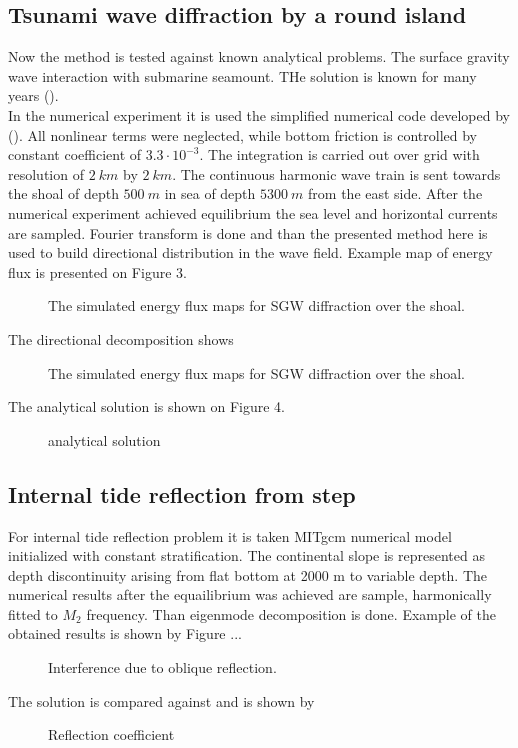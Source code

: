 \subsection{Tsunami wave diffraction by a round island}
Now the method is tested against known analytical problems. The surface gravity wave interaction with submarine seamount. THe solution is known for many years (\cite{longuet1967trapping}).\\
In the numerical experiment it is used the simplified numerical code developed by (\cite{kowalik2005numerical}). All nonlinear terms were neglected, while bottom friction is controlled by constant coefficient of $3.3 \cdot 10^{-3}$. The integration is carried out over grid with resolution of $2~km$ by $2~km$. The continuous harmonic wave train is sent towards the shoal of depth $500~m$ in sea of depth $5300~m$ from the east side. After the numerical experiment achieved equilibrium the sea level and horizontal currents are sampled. Fourier transform is done and than the presented method here is used to build directional distribution in the wave field. Example map of energy flux is presented on Figure 3.\\
\begin{figure}
\caption{The simulated energy flux maps for SGW diffraction over the shoal.}
\end{figure}
The directional decomposition shows 
\begin{figure}
\caption{The simulated energy flux maps for SGW diffraction over the shoal.}
\end{figure}
The analytical solution is shown on Figure 4.
\begin{figure}
\caption{analytical solution}
\end{figure}

\subsection{Internal tide reflection from step}
For internal tide reflection problem it is taken MITgcm numerical model initialized with constant stratification. The continental slope is represented as depth discontinuity arising from flat bottom at 2000 m to variable depth. The numerical results after the equailibrium was achieved are sample, harmonically fitted to $M_2$ frequency. Than eigenmode decomposition is done. Example of the obtained results is shown by Figure ...\\
\begin{figure}
\caption{Interference due to oblique reflection.}
\end{figure}
The solution is compared against \cite{chapman1981scattering} and is shown by
\begin{figure}
\caption{Reflection coefficient}
\end{figure}


